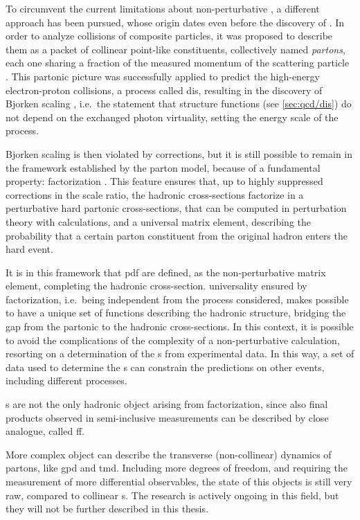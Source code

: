 To circumvent the current limitations about non-perturbative \qft, a different
approach has been pursued, whose origin dates even before the discovery of
\qcd.
In order to analyze collisions of composite particles, it was proposed to
describe them as a packet of collinear point-like constituents, collectively
named \textit{partons}, each one sharing a fraction of the measured momentum of
the scattering particle \cite{Feynman:1969wa}.
%
This partonic picture was successfully applied to predict the high-energy
electron-proton collisions, a process called \acrfull{dis}, resulting in the
discovery of Bjorken scaling \cite{Bjorken:1967fb}, i.e.\ the statement that
\dis structure functions (see \cref{sec:qcd/dis}) do not depend on the
exchanged photon virtuality, setting the energy scale of the process.

Bjorken scaling is then violated by \qcd corrections, but it is still possible
to remain in the framework established by the parton model, because of a
fundamental \qcd property: factorization \cite{Collins:1989gx}.
%
This feature ensures that, up to highly suppressed corrections in the scale
ratio, the hadronic cross-sections factorize in a perturbative hard partonic
cross-sections, that can be computed in perturbation theory with \pqft
calculations, and a universal matrix element, describing the probability that a
certain parton constituent from the original hadron enters the hard event.

It is in this framework that \acrfull{pdf} are defined, as the non-perturbative
matrix element, completing the hadronic cross-section.
\pdf universality ensured by factorization, i.e.\ being independent from the
process considered, makes possible to have a unique set of functions describing
the hadronic structure, bridging the gap from the partonic to the hadronic
cross-sections.
%
In this context, it is possible to avoid the complications of the complexity of
a non-perturbative calculation, resorting on a determination of the \pdf{}s
from experimental data.
In this way, a set of data used to determine the \pdf{}s can constrain the
predictions on other events, including different processes.

\pdf{}s are not the only hadronic object arising from factorization, since also
final products observed in semi-inclusive measurements can be described by
close analogue, called \acrfull{ff}.

More complex object can describe the transverse (non-collinear) dynamics of
partons, like \acrfull{gpd} and \acrfull{tmd}.
Including more degrees of freedom, and requiring the measurement of more
differential observables, the state of this objects is still very raw, compared
to collinear \pdf{}s.
%
The research is actively ongoing in this field, but they will not be further
described in this thesis.

